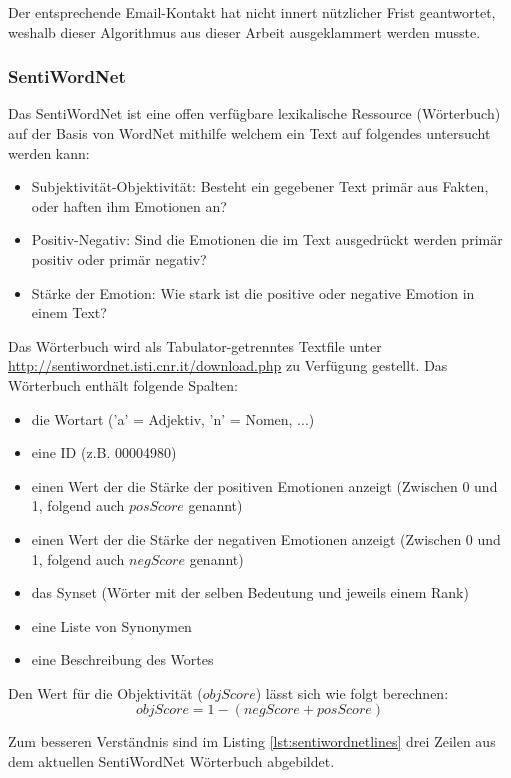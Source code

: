 Der entsprechende Email-Kontakt hat nicht innert nützlicher Frist geantwortet, weshalb dieser Algorithmus aus dieser Arbeit ausgeklammert werden musste.

\subsubsection{SentiWordNet}
Das SentiWordNet ist eine offen verfügbare lexikalische Ressource (Wörterbuch) auf der Basis von WordNet\cite{wordnet} mithilfe welchem ein Text auf folgendes untersucht werden kann:
\begin{itemize}
\item Subjektivität-Objektivität: Besteht ein gegebener Text primär aus Fakten, oder haften ihm Emotionen an?
\item Positiv-Negativ: Sind die Emotionen die im Text ausgedrückt werden primär positiv oder primär negativ?
\item Stärke der Emotion: Wie stark ist die positive oder negative Emotion in einem Text?
\end{itemize}   
Das Wörterbuch wird als Tabulator-getrenntes Textfile unter \url{http://sentiwordnet.isti.cnr.it/download.php} zu Verfügung gestellt. 
Das Wörterbuch enthält folgende Spalten:
\begin{itemize}
\item die Wortart ('a' = Adjektiv, 'n' = Nomen, ...)
\item eine ID (z.B. 00004980)
\item einen Wert der die Stärke der positiven Emotionen anzeigt (Zwischen 0 und 1, folgend auch $posScore$ genannt)
\item einen Wert der die Stärke der negativen Emotionen anzeigt (Zwischen 0 und 1, folgend auch $negScore$ genannt)
\item das Synset (Wörter mit der selben Bedeutung und jeweils einem \flqq Rank\frqq)
\item eine Liste von Synonymen
\item eine Beschreibung des Wortes
\end{itemize}

Den Wert für die Objektivität ($objScore$) lässt sich wie folgt berechnen: 
\begin{equation}
	objScore = 1-(negScore+posScore)
\end{equation}

Zum besseren Verständnis sind im Listing \ref{lst:sentiwordnetlines} drei Zeilen aus dem aktuellen SentiWordNet Wörterbuch abgebildet.

